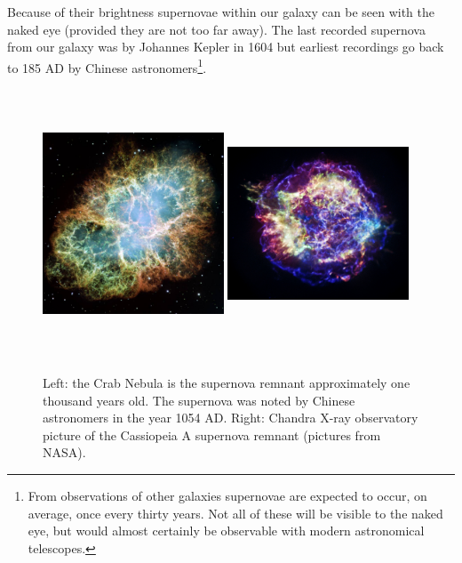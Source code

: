 Because of their brightness supernovae within our galaxy can be seen with the naked eye (provided they are not too far away). The last recorded supernova from our galaxy was by Johannes Kepler in 1604 but earliest recordings go back to 185 AD by Chinese astronomers\footnote{From observations of other galaxies supernovae are expected to occur, on average, once every thirty years. Not all of these will be visible to the naked eye, but would almost certainly be observable with modern astronomical telescopes.}.
\begin{figure}
\centering
\includegraphics[width=0.48\textwidth,height=8cm]{chapter3/img/crabnebula.jpg}
\includegraphics[width=0.48\textwidth,height=8cm]{chapter3/img/casa.jpg}
\caption{Left: the Crab Nebula is the supernova remnant approximately one thousand years old. The supernova was noted by Chinese astronomers in the year 1054 AD. Right: Chandra X-ray observatory picture of the Cassiopeia A supernova remnant (pictures from NASA).}
\label{fig:supernova}
\end{figure}
\newline

